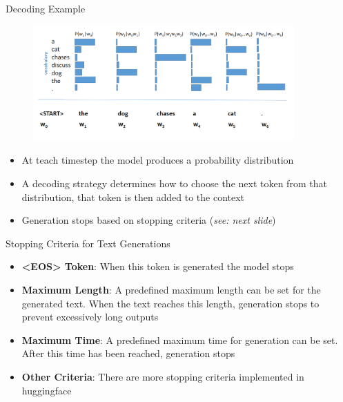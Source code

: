 \begin{vbframe}{Decoding Example}

\begin{figure}
    \centering
    \includegraphics[width=10cm]{figure/arlm.png}
\end{figure}

\begin{itemize}
    \item At teach timestep the model produces a probability distribution
    \item A decoding strategy determines how to choose the next token from that distribution, that token is then added to the context
    \item Generation stops based on stopping criteria (\textit{see: next slide})
\end{itemize}
    
\end{vbframe}



\begin{vbframe}{Stopping Criteria for Text Generations}

\vfill

\begin{itemize}
    \item \textbf{<EOS> Token}: When this token is generated the model stops
    \item \textbf{Maximum Length}: A predefined maximum length can be set for the generated text. When the text reaches this length, generation stops to prevent excessively long outputs
    \item \textbf{Maximum Time}: A predefined maximum time for generation can be set. After this time has been reached, generation stops
    \item \textbf{Other Criteria}: There are more stopping criteria implemented in huggingface 
\end{itemize}

\vfill

\end{vbframe}




